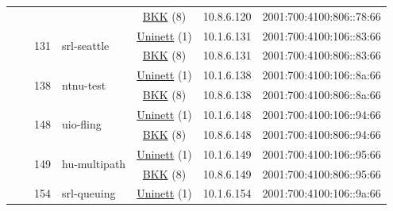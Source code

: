 \begin{small}
\begin{center}
\begin{longtable}{|c|c|c|c|c|c|c|c|}
  &  &  &  & \multicolumn{2}{|c|}{\tiny{\href{http://bkk.no}{BKK} (8)}} & \tiny{10.8.6.120} & \tiny{2001:700:4100:806::78:66} \\* \cline{3-3}\cline{4-4}\cline{5-5}\cline{6-6}\cline{7-7}\cline{8-8}
  &  & \multirow{2}{*}{\tiny{131}} & \multicolumn{1}{|l|}{\multirow{2}{*}{\tiny{srl-seattle}}} & \multicolumn{2}{|c|}{\tiny{\href{https://www.uninett.no}{Uninett} (1)}} & \tiny{10.1.6.131} & \tiny{2001:700:4100:106::83:66} \\* \cline{5-5}\cline{6-6}\cline{7-7}\cline{8-8}
  &  &  &  & \multicolumn{2}{|c|}{\tiny{\href{http://bkk.no}{BKK} (8)}} & \tiny{10.8.6.131} & \tiny{2001:700:4100:806::83:66} \\* \cline{3-3}\cline{4-4}\cline{5-5}\cline{6-6}\cline{7-7}\cline{8-8}
  &  & \multirow{2}{*}{\tiny{138}} & \multicolumn{1}{|l|}{\multirow{2}{*}{\tiny{ntnu-test}}} & \multicolumn{2}{|c|}{\tiny{\href{https://www.uninett.no}{Uninett} (1)}} & \tiny{10.1.6.138} & \tiny{2001:700:4100:106::8a:66} \\* \cline{5-5}\cline{6-6}\cline{7-7}\cline{8-8}
  &  &  &  & \multicolumn{2}{|c|}{\tiny{\href{http://bkk.no}{BKK} (8)}} & \tiny{10.8.6.138} & \tiny{2001:700:4100:806::8a:66} \\* \cline{3-3}\cline{4-4}\cline{5-5}\cline{6-6}\cline{7-7}\cline{8-8}
  &  & \multirow{2}{*}{\tiny{148}} & \multicolumn{1}{|l|}{\multirow{2}{*}{\tiny{uio-fling}}} & \multicolumn{2}{|c|}{\tiny{\href{https://www.uninett.no}{Uninett} (1)}} & \tiny{10.1.6.148} & \tiny{2001:700:4100:106::94:66} \\* \cline{5-5}\cline{6-6}\cline{7-7}\cline{8-8}
  &  &  &  & \multicolumn{2}{|c|}{\tiny{\href{http://bkk.no}{BKK} (8)}} & \tiny{10.8.6.148} & \tiny{2001:700:4100:806::94:66} \\* \cline{3-3}\cline{4-4}\cline{5-5}\cline{6-6}\cline{7-7}\cline{8-8}
  &  & \multirow{2}{*}{\tiny{149}} & \multicolumn{1}{|l|}{\multirow{2}{*}{\tiny{hu-multipath}}} & \multicolumn{2}{|c|}{\tiny{\href{https://www.uninett.no}{Uninett} (1)}} & \tiny{10.1.6.149} & \tiny{2001:700:4100:106::95:66} \\* \cline{5-5}\cline{6-6}\cline{7-7}\cline{8-8}
  &  &  &  & \multicolumn{2}{|c|}{\tiny{\href{http://bkk.no}{BKK} (8)}} & \tiny{10.8.6.149} & \tiny{2001:700:4100:806::95:66} \\* \cline{3-3}\cline{4-4}\cline{5-5}\cline{6-6}\cline{7-7}\cline{8-8}
  &  & \multirow{2}{*}{\tiny{154}} & \multicolumn{1}{|l|}{\multirow{2}{*}{\tiny{srl-queuing}}} & \multicolumn{2}{|c|}{\tiny{\href{https://www.uninett.no}{Uninett} (1)}} & \tiny{10.1.6.154} & \tiny{2001:700:4100:106::9a:66} \\* \cline{5-5}\cline{6-6}\cline{7-7}\cline{8-8}

\end{longtable}
\end{center}
\end{small}
